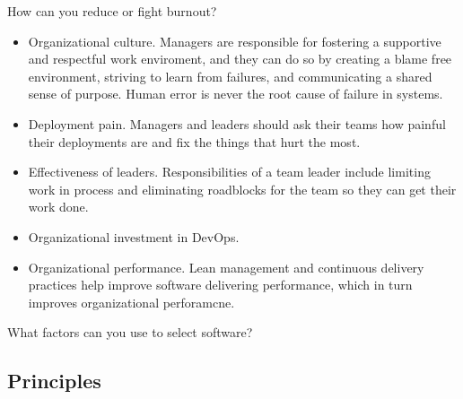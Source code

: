 \begin{questions}
\question[5] How can you reduce or fight burnout?
\begin{solution}
\begin{itemize}
    \item Organizational culture. Managers are responsible for fostering a supportive and respectful work enviroment, and they can do so by creating a blame free environment, striving to learn from failures, and communicating a shared sense of purpose. Human error is never the root cause of failure in systems.
    \item Deployment pain. Managers and leaders should ask their teams how painful their deployments are and fix the things that hurt the most.
    \item Effectiveness of leaders. Responsibilities of a team leader include limiting work in process and eliminating roadblocks for the team so they can get their work done.
    \item Organizational investment in DevOps.
    \item Organizational performance. Lean management and continuous delivery practices help improve software delivering performance, which in turn improves organizational perforamcne.
\end{itemize}
\end{solution}

\question What factors can you use to select software?
\begin{solution}
\cite[p.~119]{fode}
\end{solution}
\end{questions}

\subsection{Principles}

